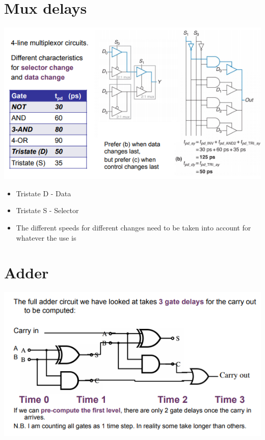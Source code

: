 \documentclass{article}[18pt]
\begin{document}
\section{Mux delays}
\begin{center}
	\includegraphics[scale=0.7]{mux_delay}
\end{center}
\begin{itemize}
	\item Tristate D - Data
	\item Tristate S - Selector
	\item The different speeds for different changes need to be taken into account for whatever the use is
\end{itemize}
\section{Adder}
\begin{center}
	\includegraphics[scale=0.7]{adder}
\end{center}
\end{document}
